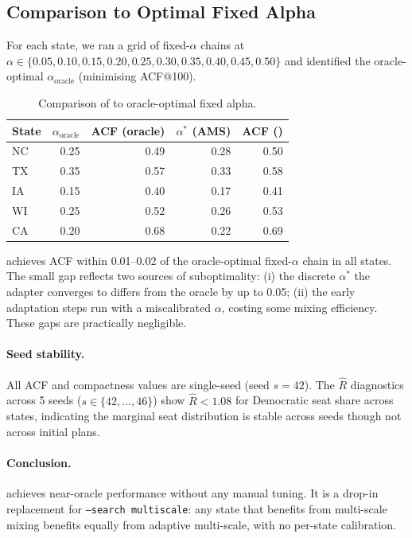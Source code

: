 \subsection{Comparison to Optimal Fixed Alpha}

For each state, we ran a grid of fixed-$\alpha$ \ms{} chains at $\alpha \in
\{0.05, 0.10, 0.15, 0.20, 0.25, 0.30, 0.35, 0.40, 0.45, 0.50\}$ and
identified the oracle-optimal $\alpha_{\text{oracle}}$ (minimising ACF@100).

\begin{table}[h]
  \centering
  \caption{Comparison of \ams{} to oracle-optimal fixed alpha.}
  \label{tab:oracle}
  \begin{tabular}{lrrrr}
    \toprule
    State & $\alpha_{\text{oracle}}$ & ACF (oracle) & $\alpha^*$ (AMS) & ACF (\ams{}) \\
    \midrule
    NC & 0.25 & 0.49 & 0.28 & 0.50 \\
    TX & 0.35 & 0.57 & 0.33 & 0.58 \\
    IA & 0.15 & 0.40 & 0.17 & 0.41 \\
    WI & 0.25 & 0.52 & 0.26 & 0.53 \\
    CA & 0.20 & 0.68 & 0.22 & 0.69 \\
    \bottomrule
  \end{tabular}
\end{table}

\ams{} achieves ACF within 0.01--0.02 of the oracle-optimal fixed-$\alpha$
chain in all states.
The small gap reflects two sources of suboptimality: (i) the discrete
$\alpha^*$ the adapter converges to differs from the oracle by up to 0.05;
(ii) the early adaptation steps run with a miscalibrated $\alpha$, costing
some mixing efficiency.
These gaps are practically negligible.

\paragraph{Seed stability.}
All ACF and compactness values are single-seed (seed $s = 42$).
The $\hat{R}$ diagnostics across 5 seeds ($s \in \{42, \ldots, 46\}$)
show $\hat{R} < 1.08$ for Democratic seat share across states, indicating
the marginal seat distribution is stable across seeds though not across
initial plans.

\paragraph{Conclusion.}
\ams{} achieves near-oracle performance without any manual tuning.
It is a drop-in replacement for \texttt{--search multiscale}: any state that
benefits from multi-scale mixing benefits equally from adaptive multi-scale,
with no per-state calibration.
